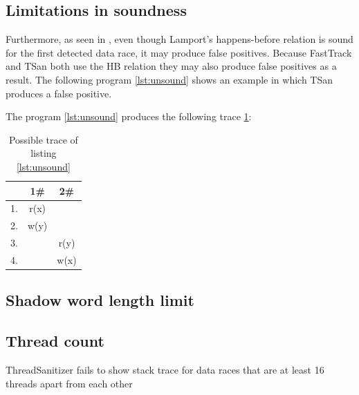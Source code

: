 \documentclass[12pt]{article}
\begin{document}
	\subsection{Limitations in soundness}
	Furthermore, as seen in \cite[p. 2]{marthur}, even though Lamport's happens-before relation is sound for the first detected data race, it may produce false positives. Because FastTrack and TSan both use the HB relation they may also produce false positives as a result. The following program \ref{lst:unsound} shows an example in which TSan produces a false positive.
	
	The program \ref{lst:unsound} produces the following trace \ref{trace3}:
	\begin{table}[H]
		\begin{center}
			\begin{tabular}{ c c c}
				& 1\# & 2\# \\
				\hline
				1. & r(x) & \\
				2. & w(y) & \\
				3. & & r(y) \\
				4. & & w(x) \\
			\end{tabular}
			\caption{Possible trace of listing \ref{lst:unsound}}
			\label{trace3}
		\end{center}
	\end{table}
	
	\subsection{Shadow word length limit}
	
	
	
	\subsection{Thread count}
	ThreadSanitizer fails to show stack trace for data races that are at least 16 threads apart from each other
	
	
	
\end{document}
